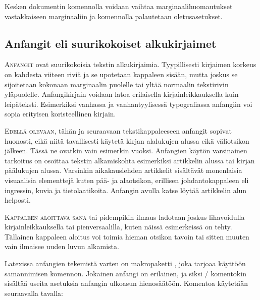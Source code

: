\begin{koodilohkosis}
  \setlength{\marginparwidth}{50bp}
  \setlength{\marginparsep}{10bp}
  \setlength{\marginparpush}{6bp}
\end{koodilohkosis}

Kesken dokumentin komennolla  voidaan vaihtaa
marginaalihuomautukset vastakkaiseen marginaaliin ja komennolla
 palautetaan oletusasetukset.

\subsection{Anfangit eli suurikokoiset alkukirjaimet}

\lettrine[lines=3, loversize=.06, lhang=.02, findent=-5bp, nindent=4bp,
slope=4bp]{A}{nfangit} ovat suurikokoisia tekstin alkukirjaimia.
Tyypillisesti kirjaimen korkeus on kahdesta viiteen riviä ja se
upotetaan kappaleen sisään, mutta joskus se sijoitetaan kokonaan
marginaalin puolelle tai yltää normaalin tekstirivin yläpuolelle.
Anfangikirjain voidaan latoa erilaisella kirjainleikkauksella kuin
leipäteksti. Esimerkiksi vanhassa ja vanhantyylisessä typografiassa
anfangiin voi sopia erityisen koristeellinen kirjain.

\smallskip

\lettrine[lines=2, lhang=1, nindent=0bp]{E\hspace{1.5bp}}{dellä
  olevaan}, tähän ja seuraavaan tekstikappaleeseen anfangit sopivat
huonosti, eikä niitä tavallisesti käytetä kirjan alalukujen alussa eikä
väliotsikon jälkeen. Tässä ne ovatkin vain esimerkin vuoksi. Anfangien
käytön varsinainen tarkoitus on osoittaa tekstin alkamiskohta
esimerkiksi artikkelin alussa tai kirjan päälukujen alussa. Varsinkin
aikakauslehden artikkelit sisältävät monenlaisia visuaalisia elementtejä
kuten pää- ja alaotsikon, erillisen johdantokappaleen eli ingressin,
kuvia ja tietolaatikoita. Anfangin avulla katse löytää artikkelin alun
helposti.

\lettrine[lines=1, loversize=.1, lhang=.02, findent=1.5bp]{K}{appaleen
  aloittava sana} tai pidempikin ilmaus ladotaan joskus lihavoidulla
kirjainleikkauksella tai pienversaalilla, kuten näissä esimerkeissä on
tehty. Tällainen kappaleen aloitus voi toimia hieman otsikon tavoin tai
sitten muuten vain ilmaisee uuden luvun alkamista.

Latexissa anfangien tekemistä varten on makropaketti
, joka tarjoaa käyttöön samannimisen
komennon. Jokainen anfangi on erilainen, ja siksi \-/
komentokin sisältää useita asetuksia anfangin ulkoasun hienosäätöön.
Komentoa käytetään seuraavalla tavalla:

